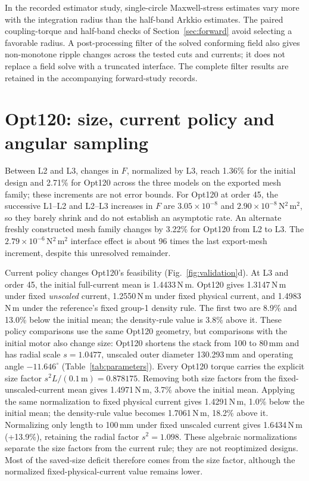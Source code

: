 \documentclass{anvil-paper}
\begin{document}
In the recorded estimator study, single-circle Maxwell-stress estimates
vary more with the integration radius than the half-band Arkkio estimates.
The paired coupling-torque and half-band checks of
Section~\ref{sec:forward} avoid selecting a favorable radius. A
post-processing filter of the solved conforming field also gives
non-monotone ripple changes across the tested cuts and currents; it does
not replace a field solve with a truncated interface. The complete filter
results are retained in the accompanying forward-study records.

\section{Opt120: size, current policy and angular sampling}\label{sec:opt120-policy}
Between L2 and L3, changes in
$F$, normalized by L3, reach 1.36\% for the initial design and 2.71\%
for Opt120 across the three models on the exported mesh family; these increments are not error bounds.
For Opt120 at order 45, the successive L1--L2 and L2--L3 increases in $F$
are $3.05\times10^{-8}$ and $2.90\times10^{-8}$\,N$^2$\,m$^2$,
so they barely shrink and do not establish an asymptotic rate. An alternate
freshly constructed mesh family changes by 3.22\% for Opt120 from L2 to L3.
The $2.79\times10^{-6}$\,N$^2$\,m$^2$ interface effect is about
96 times the last export-mesh increment, despite this unresolved remainder.

Current policy changes Opt120's feasibility (Fig.~\ref{fig:validation}d). At L3 and order 45,
the initial full-current mean is 1.4433\,N\,m. Opt120 gives 1.3147\,N\,m
under fixed \emph{unscaled} current, 1.2550\,N\,m under fixed physical
current, and 1.4983\,N\,m under the reference's fixed group-1 density rule.
The first two are 8.9\% and 13.0\% below the initial mean; the density-rule
value is 3.8\% above it. These policy comparisons use the same Opt120
geometry, but comparisons with the initial motor also change size:
Opt120 shortens the stack from 100 to 80\,mm and has radial scale
$s=1.0477$, unscaled outer diameter 130.293\,mm and operating angle
$-11.646^\circ$ (Table~\ref{tab:parameters}). Every Opt120 torque carries
the explicit size factor $s^2L/(0.1\,\mathrm{m})=0.878175$.
Removing both size factors from the fixed-unscaled-current mean gives
1.4971\,N\,m, 3.7\% above the initial mean. Applying the same normalization
to fixed physical current gives 1.4291\,N\,m, 1.0\% below the initial mean;
the density-rule value becomes 1.7061\,N\,m, 18.2\% above it. Normalizing
only length to 100\,mm under fixed unscaled current gives 1.6434\,N\,m
(+13.9\%), retaining the radial factor $s^2=1.098$.
These algebraic normalizations separate the size factors from the current
rule; they are not reoptimized designs. Most of the saved-size deficit
therefore comes from the size factor, although the normalized
fixed-physical-current value remains lower.
\end{document}
